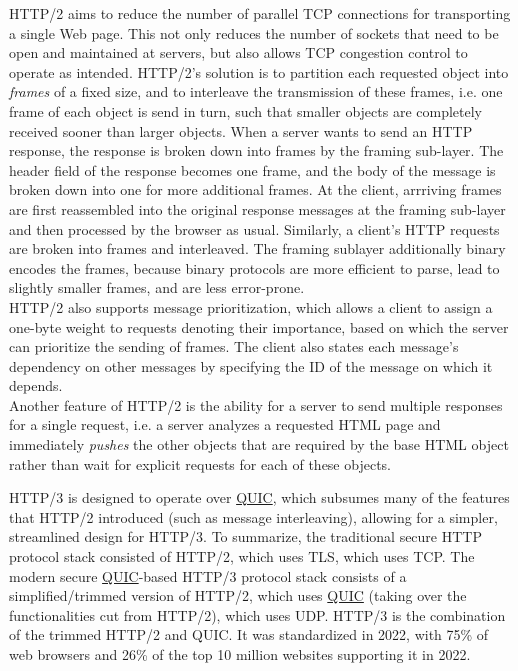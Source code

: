 \documentclass[table, xcdraw]{article}%
\begin{document}
HTTP/2 aims to reduce the number of parallel TCP connections for transporting a single Web page. This not only reduces the number of sockets that need to be open and maintained at servers, but also allows TCP congestion control to operate as intended. HTTP/2's solution is to partition each requested object into \emph{frames} of a fixed size, and to interleave the transmission of these frames, i.e. one frame of each object is send in turn, such that smaller objects are completely received sooner than larger objects. When a server wants to send an HTTP response, the response is broken down into frames by the framing sub-layer. The header field of the response becomes one frame, and the body of the message is broken down into one for more additional frames. At the client, arrriving frames are first reassembled into the original response messages at the framing sub-layer and then processed by the browser as usual. Similarly, a client’s HTTP requests are broken into frames and interleaved. The framing sublayer additionally binary encodes the frames, because binary protocols are more efficient to parse, lead to slightly smaller frames, and are less error-prone.\\
HTTP/2 also supports message prioritization, which allows a client to assign a one-byte weight to requests denoting their importance, based on which the server can prioritize the sending of frames. The client also states each message’s dependency on other messages by specifying the ID of the message on which it depends.\\
Another feature of HTTP/2 is the ability for a server to send multiple responses for a single request, i.e. a server analyzes a requested HTML page and immediately \emph{pushes} the other objects that are required by the base HTML object rather than wait for explicit requests for each of these objects.

HTTP/3 is designed to operate over \hyperref[ch:transport:quic]{QUIC}, which subsumes many of the features that HTTP/2 introduced (such as message interleaving), allowing for a simpler, streamlined design for HTTP/3. To summarize, the traditional secure HTTP protocol stack consisted of HTTP/2, which uses TLS, which uses TCP. The modern secure \hyperref[ch:transport:quic]{QUIC}-based HTTP/3 protocol stack consists of a simplified/trimmed version of HTTP/2, which uses \hyperref[ch:transport:quic]{QUIC} (taking over the functionalities cut from HTTP/2), which uses UDP. HTTP/3 is the combination of the trimmed HTTP/2 and QUIC. It was standardized in 2022, with 75\% of web browsers and 26\% of the top 10 million websites supporting it in 2022.
\end{document}
